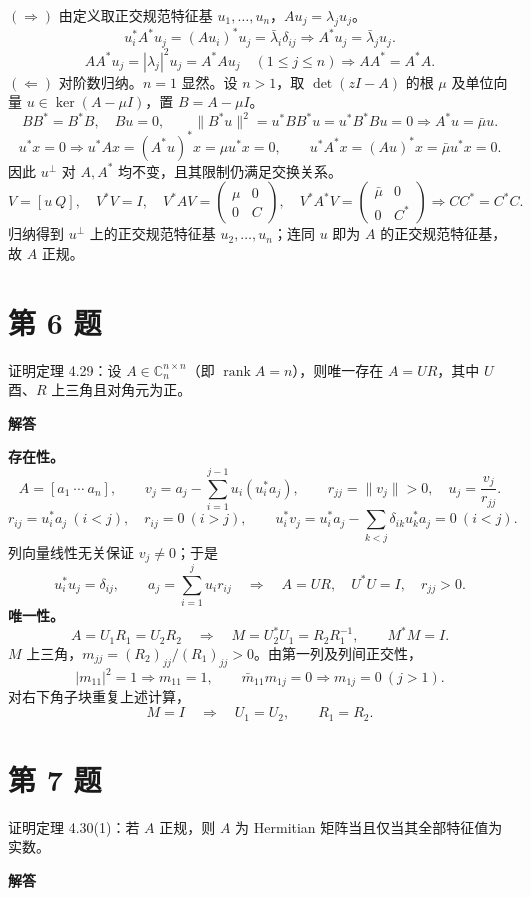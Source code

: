 \documentclass[UTF8,10pt,letterpaper,fontset=fandol]{ctexart}
\newcommand{\C}{\mathbb C}
\DeclareMathOperator{\rank}{rank}
\begin{document}
\textbf{$(\Rightarrow)$}
由定义取正交规范特征基 $u_1,\ldots,u_n$，$Au_j=\lambda_ju_j$。
\[
 u_i^*A^*u_j=(Au_i)^*u_j=\bar\lambda_i\delta_{ij}
 \Longrightarrow A^*u_j=\bar\lambda_ju_j.
\]
\[
 AA^*u_j=|\lambda_j|^2u_j=A^*Au_j\quad(1\le j\le n)
 \Longrightarrow AA^*=A^*A.
\]
\textbf{$(\Leftarrow)$}
对阶数归纳。$n=1$ 显然。设 $n>1$，取 $\det(zI-A)$ 的根 $\mu$ 及单位向量 $u\in\ker(A-\mu I)$，置 $B=A-\mu I$。
\[
 BB^*=B^*B,\quad Bu=0,\qquad
 \|B^*u\|^2=u^*BB^*u=u^*B^*Bu=0
 \Longrightarrow A^*u=\bar\mu u.
\]
\[
 u^*x=0\Longrightarrow
 u^*Ax=(A^*u)^*x=\mu u^*x=0,\qquad
 u^*A^*x=(Au)^*x=\bar\mu u^*x=0.
\]
因此 $u^\perp$ 对 $A,A^*$ 均不变，且其限制仍满足交换关系。
\[
 V=[u\ Q],\quad V^*V=I,\quad V^*AV=\begin{pmatrix}\mu&0\\0&C\end{pmatrix},\quad
 V^*A^*V=\begin{pmatrix}\bar\mu&0\\0&C^*\end{pmatrix}
 \Longrightarrow CC^*=C^*C.
\]
归纳得到 $u^\perp$ 上的正交规范特征基 $u_2,\ldots,u_n$；连同 $u$ 即为 $A$ 的正交规范特征基，故 $A$ 正规。
\newpage
\section{第 6 题}
证明定理 4.29：设 $A\in\C_n^{n\times n}$（即 $\rank A=n$），则唯一存在 $A=UR$，其中 $U$ 酉、$R$ 上三角且对角元为正。
\par{}\textbf{解答}\par

\textbf{存在性。}
\[
 A=[a_1\ \cdots\ a_n],\qquad
 v_j=a_j-\sum_{i=1}^{j-1}u_i(u_i^*a_j),\qquad
 r_{jj}=\|v_j\|>0,\quad u_j=\frac{v_j}{r_{jj}}.
\]
\[
 r_{ij}=u_i^*a_j\ (i<j),\quad r_{ij}=0\ (i>j),\qquad
 u_i^*v_j=u_i^*a_j-\sum_{k<j}\delta_{ik}u_k^*a_j=0\ (i<j).
\]
列向量线性无关保证 $v_j\ne0$；于是
\[
 u_i^*u_j=\delta_{ij},\qquad
 a_j=\sum_{i=1}^ju_ir_{ij}\quad\Longrightarrow\quad
 \boxed{A=UR,\quad U^*U=I,\quad r_{jj}>0}.
\]
\textbf{唯一性。}
\[
 A=U_1R_1=U_2R_2\quad\Longrightarrow\quad
 M=U_2^*U_1=R_2R_1^{-1},\qquad M^*M=I.
\]
$M$ 上三角，$m_{jj}=(R_2)_{jj}/(R_1)_{jj}>0$。由第一列及列间正交性，
\[
 |m_{11}|^2=1\Longrightarrow m_{11}=1,\qquad
 \bar m_{11}m_{1j}=0\Longrightarrow m_{1j}=0\ (j>1).
\]
对右下角子块重复上述计算，
\[
 M=I\quad\Longrightarrow\quad U_1=U_2,\qquad R_1=R_2.
\]
\section{第 7 题}
证明定理 4.30(1)：若 $A$ 正规，则 $A$ 为 Hermitian 矩阵当且仅当其全部特征值为实数。
\par{}\textbf{解答}\par
\end{document}
